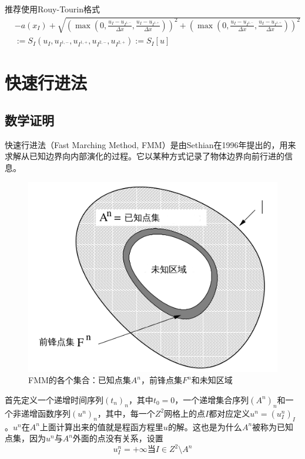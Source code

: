 推荐使用Rouy-Tourin格式
\begin{equation}
    \label{eikonal_equation_3}
    \begin{aligned}
    & -a(x_I) + \sqrt{(\max(0, \frac{u_I - u_{I^{1, -}}}{\Delta x}, \frac{u_I - u_{I^{1, +}}}{\Delta x}))^2 + (\max(0, \frac{u_I - u_{I^{1, -}}}{\Delta x}, \frac{u_I - u_{I^{1, +}}}{\Delta x}))^2} \\
    & := S_I(u_I, u_{I^{1, -}}, u_{I^{1, +}}, u_{I^{2, -}}, u_{I^{2, +}}) := S_I[u]
    \end{aligned}
\end{equation}

\section{快速行进法}
\subsection{数学证明}
快速行进法（Fast Marching Method, FMM）是由Sethian在1996年提出的，用来求解从已知边界向内部演化的过程。它以某种方式记录了物体边界向前行进的信息。
\begin{figure}[h!]
    \centering
    \includegraphics[width=300bp]{figure/sets_fmm.png}
    \caption{FMM的各个集合：已知点集$A^n$，前锋点集$F^n$和未知区域}
    \label{fig-sets_fmm}
\end{figure}

首先定义一个递增时间序列$(t_{n})_{n}$，其中$t_{0} = 0$，一个递增集合序列$(A^{n})_{n}$和一个非递增函数序列$(u^{n})_{n}$，其中，每一个$Z^{2}$网格上的点$I$都对应定义$u^{n} = (u^{n}_{I})_{I}$。$u^n$在$A^n$上面计算出来的值就是程函方程里$u$的解。这也是为什么$A^n$被称为已知点集，因为$u^n$与$A^n$外面的点没有关系，设置
\begin{equation*}
    \label{far_region}
    u^n_I = +\infty \mbox{当} I \in Z^2 \setminus A^n
\end{equation*}

